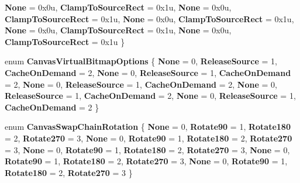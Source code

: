 \begin{DoxyCompactItemize}
{\bfseries None} = 0x0u, 
{\bfseries Clamp\+To\+Source\+Rect} = 0x1u, 
{\bfseries None} = 0x0u, 
{\bfseries Clamp\+To\+Source\+Rect} = 0x1u, 
\newline
{\bfseries None} = 0x0u, 
{\bfseries Clamp\+To\+Source\+Rect} = 0x1u, 
{\bfseries None} = 0x0u, 
{\bfseries Clamp\+To\+Source\+Rect} = 0x1u, 
\newline
{\bfseries None} = 0x0u, 
{\bfseries Clamp\+To\+Source\+Rect} = 0x1u
 \}
\item 
\mbox{\label{namespace_microsoft_1_1_graphics_1_1_canvas_a1a98137e8da81a9cc6c342d3aadbd14b}} 
enum {\bfseries Canvas\+Virtual\+Bitmap\+Options} \{ \newline
{\bfseries None} = 0, 
{\bfseries Release\+Source} = 1, 
{\bfseries Cache\+On\+Demand} = 2, 
{\bfseries None} = 0, 
\newline
{\bfseries Release\+Source} = 1, 
{\bfseries Cache\+On\+Demand} = 2, 
{\bfseries None} = 0, 
{\bfseries Release\+Source} = 1, 
\newline
{\bfseries Cache\+On\+Demand} = 2, 
{\bfseries None} = 0, 
{\bfseries Release\+Source} = 1, 
{\bfseries Cache\+On\+Demand} = 2, 
\newline
{\bfseries None} = 0, 
{\bfseries Release\+Source} = 1, 
{\bfseries Cache\+On\+Demand} = 2
 \}
\item 
\mbox{\label{namespace_microsoft_1_1_graphics_1_1_canvas_a1cf1111048d43d97b2294d0ff727e25c}} 
enum {\bfseries Canvas\+Swap\+Chain\+Rotation} \{ \newline
{\bfseries None} = 0, 
{\bfseries Rotate90} = 1, 
{\bfseries Rotate180} = 2, 
{\bfseries Rotate270} = 3, 
\newline
{\bfseries None} = 0, 
{\bfseries Rotate90} = 1, 
{\bfseries Rotate180} = 2, 
{\bfseries Rotate270} = 3, 
\newline
{\bfseries None} = 0, 
{\bfseries Rotate90} = 1, 
{\bfseries Rotate180} = 2, 
{\bfseries Rotate270} = 3, 
\newline
{\bfseries None} = 0, 
{\bfseries Rotate90} = 1, 
{\bfseries Rotate180} = 2, 
{\bfseries Rotate270} = 3, 
\newline
{\bfseries None} = 0, 
{\bfseries Rotate90} = 1, 
{\bfseries Rotate180} = 2, 
{\bfseries Rotate270} = 3
 \}
\end{DoxyCompactItemize}
